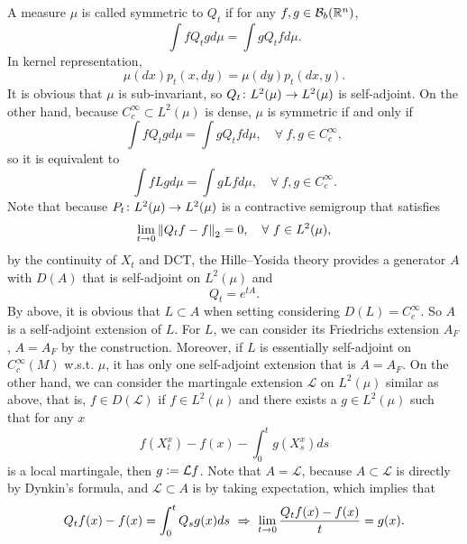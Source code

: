 A measure $\mu$ is called symmetric to $Q_t$ if for any $f,g \in \mathcal{B}_b(\mathbb{R}^n)$,
\begin{equation*}
    \int f Q_t g d\mu = \int g Q_tfd\mu.
\end{equation*}
In kernel representation,
\begin{equation*}
    \mu(dx)p_t(x,dy) = \mu(dy)p_t(dx,y).
\end{equation*}
It is obvious that $\mu$ is sub-invariant, so $Q_t \colon L^2(\mu) \rightarrow L^2(\mu)$ is self-adjoint. On the other hand, because $C_c^\infty \subset L^2(\mu)$ is dense, $\mu$ is symmetric if and only if
\begin{equation*}
    \int f Q_t g d\mu = \int g Q_tfd\mu,\quad \forall~f,g \in C_c^\infty,
\end{equation*}
so it is equivalent to
\begin{equation*}
    \int f L g d\mu = \int g Lfd\mu,\quad \forall~f,g \in C_c^\infty.
\end{equation*}
Note that because $P_t \colon L^2(\mu) \rightarrow L^2(\mu)$ is a contractive semigroup that satisfies
\begin{equation*}
    \lim_{t \rightarrow 0} \left\lVert Q_tf - f\right\lVert_2 = 0, \quad \forall~f \in L^2(\mu),
\end{equation*}
by the continuity of $X_t$ and DCT, the Hille–Yosida theory provides a generator $A$ with $D(A)$ that is self-adjoint on $L^2(\mu)$ and
\begin{equation*}
    Q_t = e^{tA}.
\end{equation*}
By above, it is obvious that $L \subset A$ when setting considering $D(L) = C_c^\infty$. So $A$ is a self-adjoint extension of $L$. For $L$, we can consider its Friedrichs extension $A_F$, $A = A_F$ by the construction. Moreover, if $L$ is essentially self-adjoint on $C_c^\infty(M)$ w.s.t. $\mu$, it has only one self-adjoint extension that is $A = A_F$. On the other hand, we can consider the martingale extension $\mathcal{L}$ on $L^2(\mu)$ similar as above, that is, $f \in D(\mathcal{L})$ if $f \in L^2(\mu)$ and there exists a $g \in L^2(\mu)$ such that for any $x$
\begin{equation*}
    f(X^x_t) - f(x) - \int_0^t g(X^x_s)ds
\end{equation*}
is a local martingale, then $g \vcentcolon= \mathcal{L}f$. Note that $A = \mathcal{L}$, because $A \subset \mathcal{L}$ is directly by Dynkin's formula, and $\mathcal{L} \subset A$ is by taking expectation, which implies that
\begin{equation*}
    Q_tf(x) - f(x) = \int_0^t Q_sg(x)ds~\Rightarrow~\lim_{t \rightarrow 0} \frac{Q_tf(x) - f(x)}{t} = g(x).
\end{equation*}

